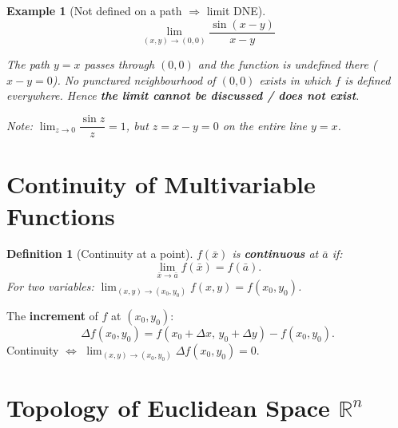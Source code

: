 \documentclass[12pt,a4paper]{article}
\newtheorem{definition}{Definition}
\newtheorem{example}{Example}
\begin{document}
\begin{example}[Not defined on a path $\Rightarrow$ limit DNE]
\[
  \lim_{(x,y)\to(0,0)} \frac{\sin(x-y)}{x-y}
\]

\begin{center}
\end{center}

The path $y=x$ passes through $(0,0)$ and the function is undefined there ($x-y=0$).
No punctured neighbourhood of $(0,0)$ exists in which $f$ is defined everywhere.
Hence \textbf{the limit cannot be discussed / does not exist}.

Note: $\lim_{z\to 0}\dfrac{\sin z}{z}=1$, but $z=x-y=0$ on the entire line $y=x$.
\end{example}

\section*{Continuity of Multivariable Functions}

\begin{definition}[Continuity at a point]
$f(\bar{x})$ is \textbf{continuous} at $\bar{a}$ if:
\[
  \lim_{\bar{x}\to\bar{a}} f(\bar{x}) = f(\bar{a}).
\]
For two variables: $\displaystyle\lim_{(x,y)\to(x_0,y_0)} f(x,y) = f(x_0,y_0)$.
\end{definition}

The \textbf{increment} of $f$ at $(x_0,y_0)$:
\[
  \Delta f(x_0,y_0) = f(x_0+\Delta x,\, y_0+\Delta y) - f(x_0,y_0).
\]
Continuity $\iff$ $\displaystyle\lim_{(x,y)\to(x_0,y_0)}\Delta f(x_0,y_0) = 0$.

\section*{Topology of Euclidean Space $\mathbb{R}^n$}
\end{document}
